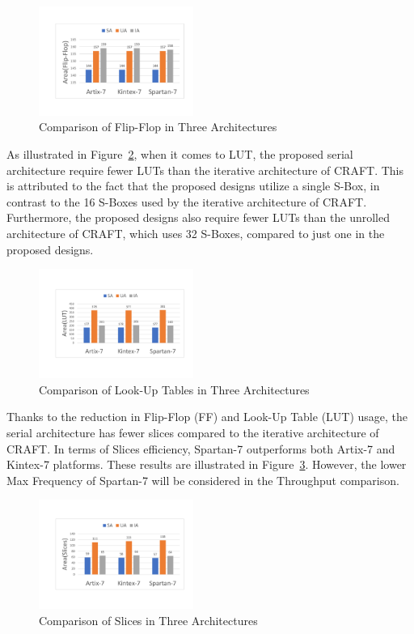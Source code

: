 \documentclass[final,5p,times,twocolumn]{elsarticle}
\begin{document}
\begin{figure}
    \centering
    \includegraphics[width=0.45\textwidth]{./compare-ff.pdf}
    \caption{Comparison of Flip-Flop in Three Architectures}\label{compare_ff}
\end{figure}

As illustrated in Figure~\ref{compare_lut}, when it comes to LUT, the proposed serial architecture require fewer LUTs than the iterative architecture of CRAFT. This is attributed to the fact that the proposed designs utilize a single S-Box, in contrast to the 16 S-Boxes used by the iterative architecture of CRAFT. Furthermore, the proposed designs also require fewer LUTs than the unrolled architecture of CRAFT, which uses 32 S-Boxes, compared to just one in the proposed designs.

\begin{figure}
    \centering
    \includegraphics[width=0.45\textwidth]{./compare-lut.pdf}
    \caption{Comparison of Look-Up Tables in Three Architectures}\label{compare_lut}
\end{figure}

Thanks to the reduction in Flip-Flop (FF) and Look-Up Table (LUT) usage, the serial architecture has fewer slices compared to the iterative architecture of CRAFT.
In terms of Slices efficiency, Spartan-7 outperforms both Artix-7 and Kintex-7 platforms.
These results are illustrated in Figure~\ref{compare-slices}. However, the lower Max Frequency of Spartan-7 will be considered in the Throughput comparison.

\begin{figure}
    \centering
    \includegraphics[width=0.45\textwidth]{./compare-slices.pdf}
    \caption{Comparison of Slices in Three Architectures}\label{compare-slices}
\end{figure}
\end{document}
